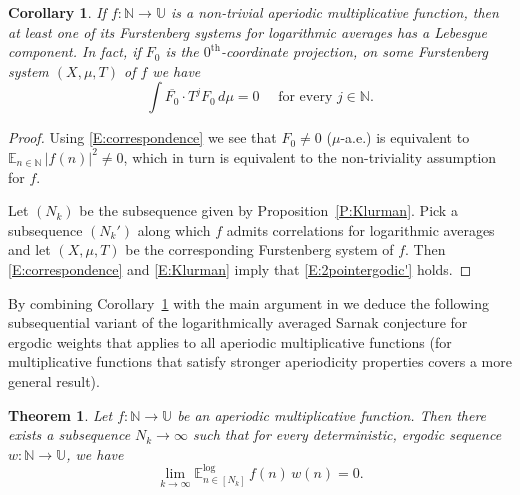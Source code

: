 \documentclass[11pt]{amsart}
\newtheorem{theorem}[lemma]{Theorem}
\newtheorem{corollary}[lemma]{Corollary}
\theoremstyle{definition}
\newcommand{\lE}{\mathbb{E}^{\log}}
\newcommand{\E}{{\mathbb E}}
\newcommand{\N}{{\mathbb N}}
\newcommand{\U}{{\mathbb U}}
\begin{document}
\begin{corollary}\label{C:LebesgueComponent}
	If  $f\colon \N\to \U$  is a non-trivial aperiodic multiplicative function, then at least one of its Furstenberg systems  for logarithmic averages has  a Lebesgue component. In fact,  if  $F_0$ is the $0^{\text{th}}$-coordinate projection, on some Furstenberg system  $(X,\mu,T)$ of $f$ we have
	\begin{equation}\label{E:2pointergodic'}
		\int \overline{F_0}\cdot T^jF_0\, d\mu=0 \quad \text{ for every }  j\in \N.
	\end{equation}
\end{corollary}
\begin{proof}
	Using \eqref{E:correspondence} we see that $F_0\neq 0$ ($\mu$-a.e.) is equivalent to $\E_{n\in \N} \, |f(n)|^2\neq 0$, which in turn is equivalent to the  non-triviality assumption for $f$.
	
	Let $(N_k)$ be the subsequence given by Proposition~\ref{P:Klurman}. Pick a subsequence $(N_k')$ along which  $f$ admits correlations for logarithmic averages and let $(X,\mu,T)$ be the corresponding Furstenberg system of $f$. Then \eqref{E:correspondence} and \eqref{E:Klurman}    imply that \eqref{E:2pointergodic'} holds.
\end{proof}
By combining Corollary~\ref{C:LebesgueComponent} with the main argument  in \cite{FH21}
we deduce the following
subsequential variant of the logarithmically averaged Sarnak conjecture for ergodic weights that applies to all aperiodic multiplicative functions (for multiplicative functions  that satisfy  stronger aperiodicity properties \cite[Theorem~1.1]{FH21} covers a more general result).
\begin{theorem}\label{T:SarnakErgodic}
	Let   $f\colon \N\to \U$ be an aperiodic multiplicative function. Then there exists a subsequence $N_k\to\infty$ such that    for every deterministic, ergodic sequence $w\colon \N\to \U$, we have
	$$
	\lim_{k\to\infty} \lE_{n\in [N_k]} \, f(n)\, w(n)=0.
	$$
\end{theorem}
\end{document}
